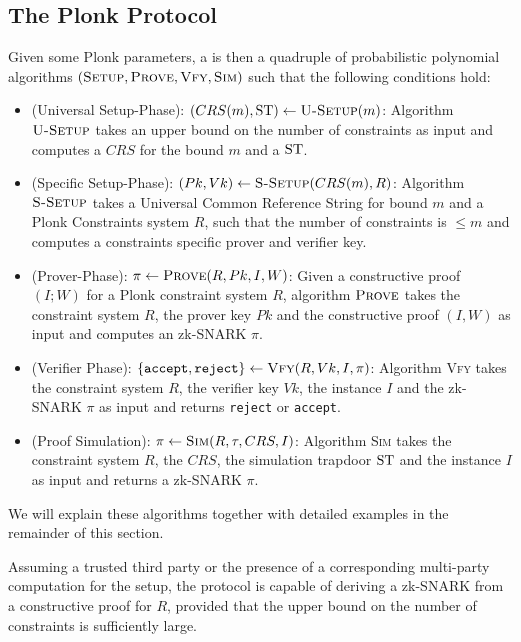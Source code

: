 \subsection{The Plonk Protocol}
Given some Plonk parameters, a  is then a quadruple of probabilistic polynomial algorithms $(\textsc{Setup},\textsc{Prove},\textsc{Vfy},\textsc{Sim})$ such that the following conditions hold:

\begin{itemize}
\item (Universal Setup-Phase): $(CRS(m),\mathrm{ST})\leftarrow \textsc{U-Setup}(m)$: Algorithm $\textsc{U-Setup}$ takes an upper bound on the number of constraints as input and computes a  $CRS$ for the bound $m$ and a  $\mathrm{ST}$.
\item (Specific Setup-Phase): $(Pk,Vk)\leftarrow \textsc{S-Setup}(CRS(m),R)$: Algorithm $\textsc{S-Setup}$ takes a Universal Common Reference String for bound $m$ and a Plonk Constraints system $R$, such that the number of constraints is $\leq m$ and computes a constraints specific prover and verifier key. 
\item (Prover-Phase): $\pi\leftarrow \textsc{Prove}(R,Pk,I,W)$: Given a constructive proof $(I;W)$ for a Plonk constraint system $R$, algorithm $\textsc{Prove}$ takes the constraint system $R$, the prover key $Pk$ and the constructive proof $(I,W)$ as input and computes an zk-SNARK $\pi$.
\item (Verifier Phase): $\{\mathtt{accept},\mathtt{reject}\}\leftarrow \textsc{Vfy}(R,Vk,I,\pi)$: Algorithm \textsc{Vfy} takes the constraint system $R$, the verifier key $Vk$, the instance $I$ and the zk-SNARK $\pi$ as input and returns \texttt{reject} or \texttt{accept}.
\item (Proof Simulation): $\pi\leftarrow \textsc{Sim}(R,\tau,CRS, I)$: Algorithm \textsc{Sim} takes the constraint system $R$, the  $CRS$, the simulation trapdoor $\mathrm{ST}$ and the instance $I$ as input and returns a zk-SNARK $\pi$. 
\end{itemize}
We will explain these algorithms together with detailed examples in the remainder of this section.

Assuming a trusted third party or the presence of a corresponding multi-party computation for the setup, the protocol is capable of deriving a zk-SNARK from a constructive proof for $R$, provided that the upper bound on the number of constraints is sufficiently large.

